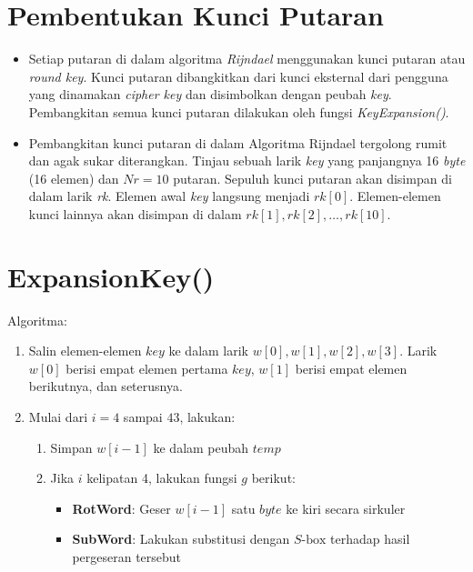 \documentclass{article}
\begin{document}
\newpage


\section*{Pembentukan Kunci Putaran}

\begin{itemize}
    \item Setiap putaran di dalam algoritma \textit{Rijndael} menggunakan kunci putaran atau \textit{round key}. Kunci putaran dibangkitkan dari kunci eksternal dari pengguna yang dinamakan \textit{cipher key} dan disimbolkan dengan peubah \textit{key}. Pembangkitan semua kunci putaran dilakukan oleh fungsi \textit{KeyExpansion()}.
    \item Pembangkitan kunci putaran di dalam Algoritma Rijndael tergolong rumit dan agak sukar diterangkan. Tinjau sebuah larik \textit{key} yang panjangnya 16 \textit{byte} (16 elemen) dan $Nr = 10$ putaran. Sepuluh kunci putaran akan disimpan di dalam larik \textit{rk}. Elemen awal \textit{key} langsung menjadi $rk[0]$. Elemen-elemen kunci lainnya akan disimpan di dalam $rk[1], rk[2], \dots, rk[10]$.
\end{itemize}

\newpage


\section*{ExpansionKey()}

Algoritma:

\begin{enumerate}
    \item Salin elemen-elemen $key$ ke dalam larik $w[0], w[1], w[2], w[3]$. Larik $w[0]$ berisi empat elemen pertama $key$, $w[1]$ berisi empat elemen berikutnya, dan seterusnya.
    \item Mulai dari $i = 4$ sampai $43$, lakukan:
    \begin{enumerate}
        \item Simpan $w[i-1]$ ke dalam peubah $temp$
        \item Jika $i$ kelipatan 4, lakukan fungsi $g$ berikut:
        \begin{itemize}
            \item \textbf{RotWord}: Geser $w[i-1]$ satu $byte$ ke kiri secara sirkuler
            \item \textbf{SubWord}: Lakukan substitusi dengan $S\text{-box}$ terhadap hasil pergeseran tersebut
        \end{itemize}
    \end{enumerate}
\end{enumerate}
\end{document}

